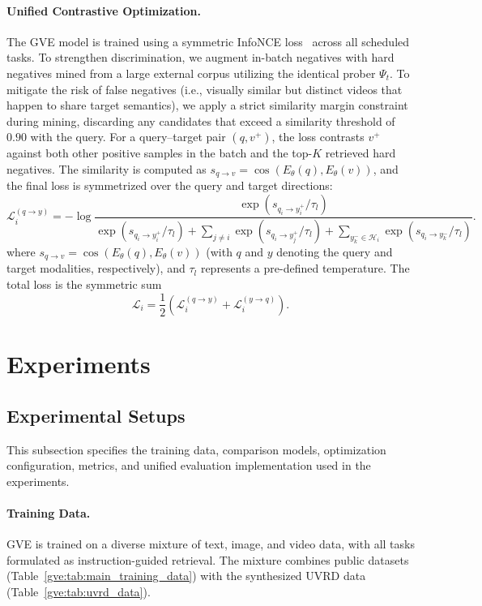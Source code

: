 \paragraph{Unified Contrastive Optimization.}
The GVE model is trained using a symmetric InfoNCE loss~\cite{oord2018representation} across all scheduled tasks. To strengthen discrimination, we augment in-batch negatives with hard negatives mined from a large external corpus utilizing the identical prober $\Psi_t$. To mitigate the risk of false negatives (i.e., visually similar but distinct videos that happen to share target semantics), we apply a strict similarity margin constraint during mining, discarding any candidates that exceed a similarity threshold of $0.90$ with the query. For a query–target pair $(q, v^+)$, the loss contrasts $v^+$ against both other positive samples in the batch and the top-$K$ retrieved hard negatives.
The similarity is computed as $s_{q \to v} = \cos(E_\theta(q), E_\theta(v))$, and the final loss is symmetrized over the query and target directions:
\begin{equation}
\mathcal{L}_{i}^{(q \to y)} = -\log
\frac{\exp(s_{q_i \to y_i^+}/\tau_l)}
{\exp(s_{q_i \to y_i^+}/\tau_l) + \sum_{j \neq i}\exp(s_{q_i \to y_j^+}/\tau_l) + \sum_{y_k^- \in \mathcal{H}_i}\exp(s_{q_i \to y_k^-}/\tau_l)}.
\end{equation}
where $s_{q \to v} = \cos(E_\theta(q), E_\theta(v))$ (with $q$ and $y$ denoting the query and target modalities, respectively), and $\tau_l$ represents a pre-defined temperature. The total loss is the symmetric sum
\begin{equation*}
\mathcal{L}_i = \frac{1}{2}\left(\mathcal{L}_i^{(q \to y)} + \mathcal{L}_i^{(y \to q)}\right).
\end{equation*}


\FloatBarrier
\section{Experiments}\label{gve:sec:exp}

\subsection{Experimental Setups}\label{gve:sec:setup}

This subsection specifies the training data, comparison models, optimization configuration, metrics, and unified evaluation implementation used in the experiments.

\paragraph{Training Data.}
GVE is trained on a diverse mixture of text, image, and video data, with all tasks formulated as instruction-guided retrieval. The mixture combines public datasets (Table~\ref{gve:tab:main_training_data}) with the synthesized UVRD data (Table~\ref{gve:tab:uvrd_data}).


